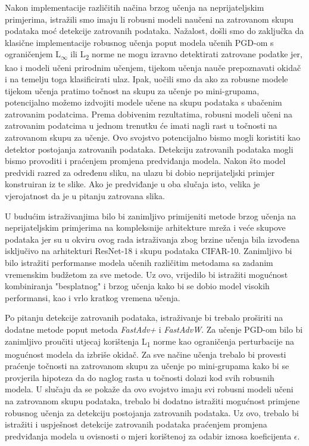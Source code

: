\documentclass[times, utf8, zavrsni, numeric]{fer}
\begin{document}
Nakon implementacije različitih načina brzog učenja na neprijateljskim primjerima, istražili smo imaju li robusni modeli naučeni na zatrovanom skupu podataka moć detekcije zatrovanih podataka.
Nažalost, došli smo do zaključka da klasične implementacije robusnog učenja poput modela učenih PGD-om s ograničenjem L\textsubscript{$\infty$} ili L\textsubscript{2} norme ne mogu izravno detektirati zatrovane podatke jer, kao i modeli učeni prirodnim učenjem, 
tijekom učenja nauče prepoznavati okidač i na temelju toga klasificirati ulaz. 
Ipak, uočili smo da ako za robusne modele tijekom učenja pratimo točnost na skupu za učenje po mini-grupama, potencijalno možemo izdvojiti modele učene na skupu podataka s ubačenim zatrovanim podatcima.
Prema dobivenim rezultatima, robusni modeli učeni na zatrovanim podatcima u jednom trenutku će imati nagli rast u točnosti na zatrovanom skupu za učenje. Ovo svojstvo potencijalno bismo mogli koristiti kao detektor postojanja zatrovanih podataka.
Detekciju zatrovanih podataka mogli bismo provoditi i praćenjem promjena predviđanja modela. Nakon što model predvidi razred za određenu sliku, na ulazu bi dobio neprijateljski primjer konstruiran iz te slike.
Ako je predviđanje u oba slučaja isto, velika je vjerojatnost da je u pitanju zatrovana slika.

\pagebreak

U budućim istraživanjima bilo bi zanimljivo primijeniti metode brzog učenja na neprijateljskim primjerima na kompleksnije arhitekture mreža i veće skupove podataka 
jer su u okviru ovog rada istraživanja zbog brzine učenja bila izvođena isključivo na arhitekturi ResNet-18 i skupu podataka CIFAR-10. 
Zanimljivo bi bilo istražiti performanse modela učenih različitim metodama sa zadanim vremenskim budžetom za sve metode.
Uz ovo, vrijedilo bi istražiti mogućnost kombiniranja "besplatnog" i brzog učenja kako bi se dobio model visokih performansi, kao i vrlo kratkog vremena učenja. 

Po pitanju detekcije zatrovanih podataka, istraživanje bi trebalo proširiti na dodatne metode poput metoda \textit{FastAdv+} i \textit{FastAdvW}.
Za učenje PGD-om bilo bi zanimljivo proučiti utjecaj korištenja L\textsubscript{1} norme kao ograničenja perturbacije na mogućnost modela da izbriše okidač.
Za sve načine učenja trebalo bi provesti praćenje točnosti na zatrovanom skupu za učenje po mini-grupama kako bi se provjerila hipoteza da do naglog rasta u točnosti dolazi kod svih robusnih modela.
U slučaju da se pokaže da ovo svojstvo imaju svi robusni modeli učeni na zatrovanom skupu podataka, trebalo bi dodatno istražiti mogućnost primjene robusnog učenja za detekciju postojanja zatrovanih podataka.
Uz ovo, trebalo bi istražiti i uspješnost detekcije zatrovanih podataka praćenjem promjena predviđanja modela u ovisnosti o mjeri korištenoj za odabir iznosa koeficijenta $\epsilon$.
\end{document}
